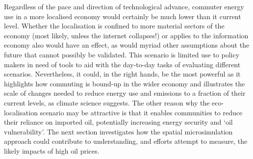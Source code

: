 Regardless of the pace and direction of technological advance, commuter
energy use in a more localised economy would certainly be much lower than
it current level. Whether the localisation is confined to more material
sectors of the economy (most likely, unless the internet collapses!) or
applies to the information economy also would have an effect, as would
myriad other assumptions about the future that cannot possibly be validated.
This scenario is limited use to policy makers in need of tools to
aid with the day-to-day tasks of evaluating different scenarios.
Nevertheless, it could, in the right hands, be the most powerful as it
highlights how commuting is bound-up in the wider economy and illustrates
the scale of changes needed to reduce energy use and emissions to a fraction
of their current levels, as climate science suggests. The other reason why
the eco-localisation scenario may be attractive is that it enables communities
to reduce their reliance on imported oil, potentially increasing energy
security and `oil vulnerability'. The next section investigates how
the spatial microsimulation approach could contribute to understanding,
and efforts attempt to measure, the likely impacts of high oil prices.


